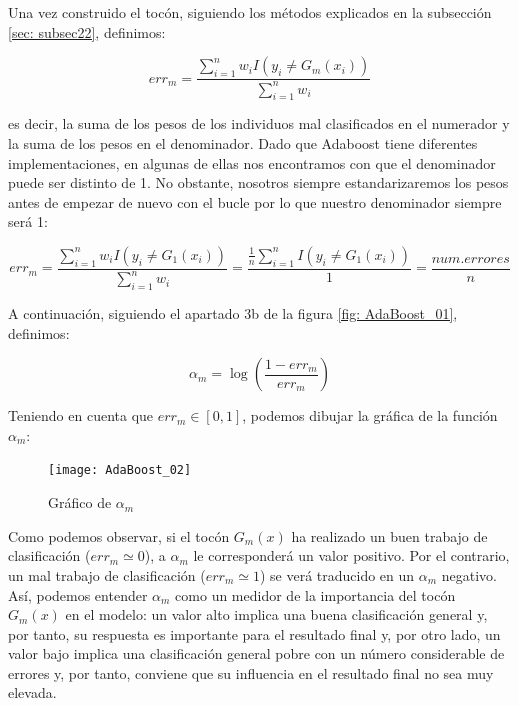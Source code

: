 \documentclass[12pt,twoside]{article}
\begin{document}
Una vez construido el tocón, siguiendo los métodos explicados en la subsección \ref{sec: subsec22}, definimos:

\begin{equation*}
err_m = \frac{\sum_{i=1}^{n} w_i I(y_i \neq G_m(x_i))}{\sum_{i=1}^{n} w_i} 
\end{equation*}

\noindent
es decir, la suma de los pesos de los individuos mal clasificados en el numerador y la suma de los pesos en el denominador. Dado que Adaboost tiene diferentes implementaciones, en algunas de ellas nos encontramos con que el denominador puede ser distinto de 1. No obstante, nosotros siempre estandarizaremos los pesos antes de empezar de nuevo con el bucle por lo que nuestro denominador siempre será 1:

\begin{equation*}
err_m = \frac{\sum_{i=1}^{n} w_i I(y_i \neq G_1(x_i))}{\sum_{i=1}^{n} w_i} = \frac{\frac{1}{n} \sum_{i=1}^{n}I(y_i \neq G_1(x_i))}{1} = \frac{num.errores}{n}
\end{equation*}

A continuación, siguiendo el apartado 3b de la figura \ref{fig: AdaBoost_01}, definimos:

\begin{equation*}
\alpha _m = \log \left( \frac{1 - err_m}{err_m} \right)
\end{equation*}

Teniendo en cuenta que $err_m \in [0, 1]$, podemos dibujar la gráfica de la función $\alpha_m$:

\begin{figure}[h]
\centering
\texttt{[image: AdaBoost\_02]}
\caption{Gráfico de $\alpha_m$}
\label{fig: AdaBoost_02}
\end{figure}

Como podemos observar, si el tocón $G_m(x)$ ha realizado un buen trabajo de clasificación ($err_m \simeq 0$), a $\alpha_m$ le corresponderá un valor positivo. Por el contrario, un mal trabajo de clasificación ($err_m \simeq 1$) se verá traducido en un $\alpha_m$ negativo. Así, podemos entender $\alpha_m$ como un medidor de la importancia del tocón $G_m(x)$ en el modelo: un valor alto implica una buena clasificación general y, por tanto, su respuesta es importante para el resultado final y, por otro lado, un valor bajo implica una clasificación general pobre con un número considerable de errores y, por tanto, conviene que su influencia en el resultado final no sea muy elevada.
\end{document}
